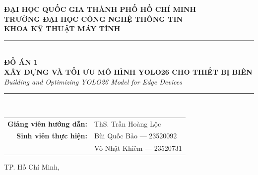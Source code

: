\begin{titlepage}
    \begin{center}

        \textbf{ĐẠI HỌC QUỐC GIA THÀNH PHỐ HỒ CHÍ MINH}\\[4pt]
        \textbf{TRƯỜNG ĐẠI HỌC CÔNG NGHỆ THÔNG TIN}\\[4pt]
        \textbf{KHOA KỸ THUẬT MÁY TÍNH}\\[8pt]

        \vspace{1cm}

        \rule{\textwidth}{1pt}\\[12pt]

        {\Large \textbf{ĐỒ ÁN 1}}\\[16pt]
        
        {\LARGE \textbf{XÂY DỰNG VÀ TỐI ƯU MÔ HÌNH YOLO26 CHO THIẾT BỊ BIÊN}}\\[8pt]
        {\large \textit{Building and Optimizing YOLO26 Model for Edge Devices}}\\[12pt]

        \rule{\textwidth}{1pt}\\[2cm]

        \begin{tabular}{r l}
            \textbf{Giảng viên hướng dẫn:} & ThS. Trần Hoàng Lộc      \\[8pt]
            \textbf{Sinh viên thực hiện:}  & Bùi Quốc Bảo — 23520092  \\
                                           & Võ Nhật Khiêm — 23520731 \\
        \end{tabular}

        \vfill

        {\large TP. Hồ Chí Minh, \the\year}

    \end{center}
\end{titlepage}
